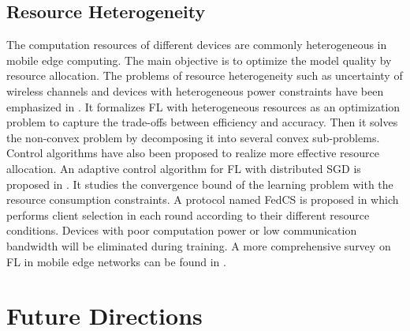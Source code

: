 \documentclass[11pt]{article}
\begin{document}
\subsection{Resource Heterogeneity}

The computation resources of different devices are commonly heterogeneous in mobile edge computing.
The main objective is to optimize the model quality by resource allocation.
The problems of resource heterogeneity such as uncertainty of wireless channels and devices with heterogeneous power constraints have been emphasized in \cite{DBLP:conf/infocom/TranBZMH19}. It formalizes FL with heterogeneous resources as an optimization problem to capture the trade-offs between efficiency and accuracy. Then it solves the non-convex problem by decomposing it into several convex sub-problems.
Control algorithms have also been proposed to realize more effective resource allocation.
An adaptive control algorithm for FL with distributed SGD is proposed in \cite{DBLP:journals/jsac/WangTSLMHC19}. It studies the convergence bound of the learning problem with the resource consumption constraints. 
A protocol named FedCS is proposed in \cite{DBLP:conf/icc/NishioY19} which performs client selection in each round according to their different resource conditions. 
Devices with poor computation power or low communication bandwidth will be eliminated during training.
A more comprehensive survey on FL in mobile edge networks can be found in \cite{DBLP:journals/comsur/LimLHJLYNM20}.

\section{Future Directions}
\end{document}
